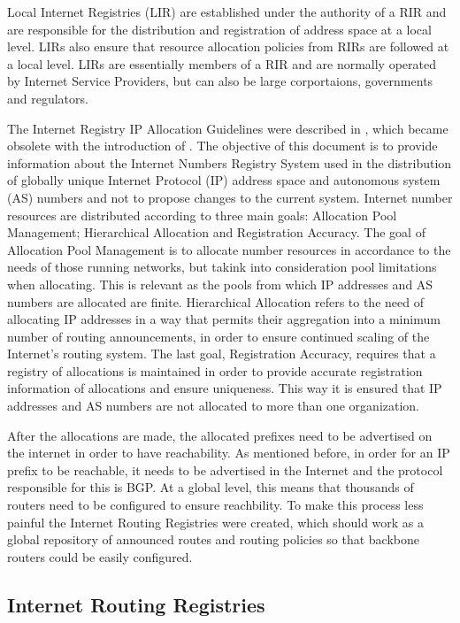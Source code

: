 \documentclass[11pt,a4paper]{scrreprt}
\begin{document}
Local Internet Registries (LIR) are  established under the authority of a RIR and are responsible for the distribution and registration of address space at a local level. LIRs also ensure that resource allocation policies from RIRs are followed at a local level. LIRs are essentially members of a RIR and are normally operated by Internet Service Providers, but can also be large corportaions, governments and regulators.

The Internet Registry IP Allocation Guidelines were described in \cite{RFC_2050}, which became obsolete with the introduction of \cite{RFC_7020}. The objective of this document is to provide information about the Internet Numbers Registry System used in the distribution of globally unique Internet Protocol (IP) address space and autonomous system (AS) numbers and not to propose changes to the current system. Internet number resources are distributed according to three main goals: Allocation Pool Management; Hierarchical Allocation and Registration Accuracy. The goal of Allocation Pool Management is to allocate number resources in accordance to the needs of those running networks, but takink into consideration pool limitations when allocating. This is relevant as the pools from which IP addresses and AS numbers are allocated are finite. Hierarchical Allocation refers to the need of allocating IP addresses in a way that permits their aggregation into a minimum number of routing announcements, in order to ensure continued scaling of the Internet's routing system. The last goal, Registration Accuracy,  requires that a registry of allocations is maintained in order to provide accurate registration information of allocations and ensure uniqueness. This way it is ensured that IP addresses and AS numbers are not allocated to more than one organization.  

After the allocations are made, the allocated prefixes need to be advertised on the internet in order to have reachability. As mentioned before, in order for an IP prefix to be reachable, it needs to be advertised in the Internet and the protocol responsible for this is BGP. At a global level, this means that thousands of routers need to be configured to ensure reachbility. To make this process less painful the Internet Routing Registries were created, which should work as a global repository of announced routes and routing policies so that backbone routers could be easily configured. 

\subsection{Internet Routing Registries}
\end{document}
